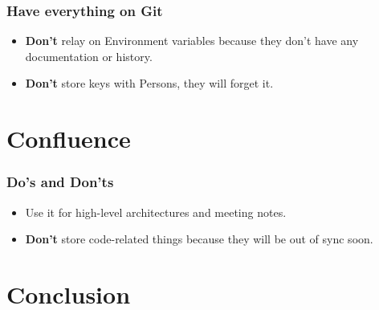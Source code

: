 \documentclass{efd-lecture}
\begin{document}
\begin{frame}
  \frametitle{Have everything on Git}
  \begin{itemize}
    \item \textbf{\color{RubineRed}Don't} relay on Environment variables because they don't have any documentation or history.
    \item \textbf{\color{RubineRed}Don't} store keys with Persons, they will forget it.
  \end{itemize}
\end{frame}

\section{Confluence}

\begin{frame}
  \frametitle{Do's and Don'ts}
  \begin{itemize}
    \item Use it for high-level architectures and meeting notes.
    \item \textbf{\color{RubineRed}Don't} store code-related things because they will be out of sync soon.
  \end{itemize}
\end{frame}

\section{Conclusion}
\end{document}
